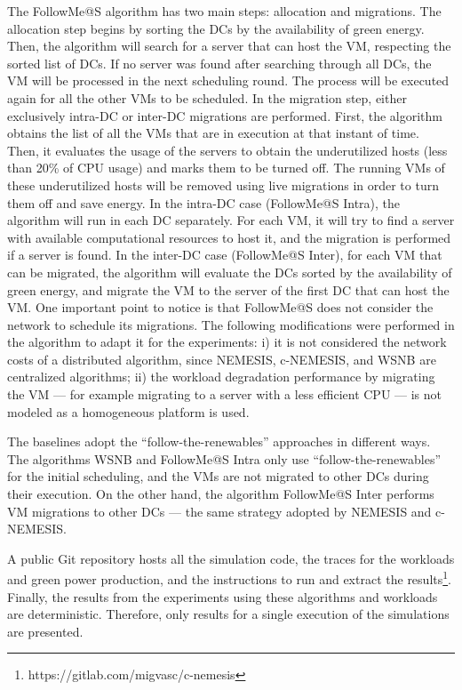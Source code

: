 The FollowMe@S algorithm has two main steps: allocation and migrations. The allocation step begins by sorting the DCs by the availability of green energy. Then, the algorithm will search for a server that can host the VM, respecting the sorted list of DCs. If no server was found after searching through all DCs, the VM will be processed in the next scheduling round. The process will be executed again for all the other VMs to be scheduled. In the migration step, either exclusively intra-DC or inter-DC migrations are performed. First, the algorithm obtains the list of all the VMs that are in execution at that instant of time. Then, it evaluates the usage of the servers to obtain the underutilized hosts (less than 20\% of CPU usage) and marks them to be turned off. The running VMs of these underutilized hosts will be removed using live migrations in order to turn them off and save energy. In the intra-DC case (FollowMe@S Intra), the algorithm will run in each DC separately. For each VM, it will try to find a server with available computational resources to host it, and the migration is performed if a server is found. In the inter-DC case (FollowMe@S Inter), for each VM that can be migrated, the algorithm will evaluate the DCs sorted by the availability of green energy, and migrate the VM to the server of the first DC that can host the VM. One important point to notice is that FollowMe@S does not consider the network to schedule its migrations. The following modifications were performed in the algorithm to adapt it for the experiments: i) it is not considered the network costs of a distributed algorithm, since NEMESIS, c-NEMESIS, and WSNB are centralized algorithms; ii) the workload degradation performance by migrating the VM --- for example migrating to a server with a less efficient CPU ---  is not modeled as a homogeneous platform is used.

The baselines adopt the ``follow-the-renewables'' approaches in different ways. The algorithms WSNB and FollowMe@S Intra only use ``follow-the-renewables'' for the initial scheduling, and the VMs are not migrated to other DCs during their execution. On the other hand, the algorithm FollowMe@S Inter performs VM migrations to other DCs --- the same strategy adopted by NEMESIS and c-NEMESIS.


A public Git repository hosts all the simulation code, the traces for the workloads and green power production, and the instructions to run and extract the results\footnote{https://gitlab.com/migvasc/c-nemesis}. Finally, the results from the experiments using these algorithms and workloads are deterministic. Therefore, only results for a single execution of the simulations are presented.


